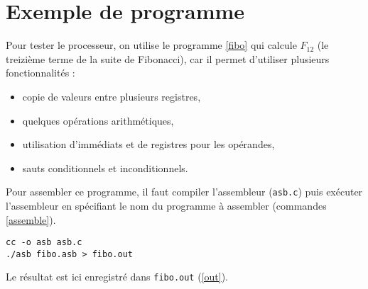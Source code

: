\section{Exemple de programme}



Pour tester le processeur, on utilise le programme \ref{fibo} qui calcule
$F_{12}$ (le treizième terme de la suite de Fibonacci\cite{fibo}), car il permet
d'utiliser plusieurs fonctionnalités :
\begin{itemize}
\item copie de valeurs entre plusieurs registres,
\item quelques opérations arithmétiques,
\item utilisation d'immédiats et de registres pour les opérandes,
\item sauts conditionnels et inconditionnels. \\
\end{itemize}

Pour assembler ce programme, il faut compiler l'assembleur (\texttt{asb.c}) puis
exécuter l'assembleur en spécifiant le nom du programme à assembler (commandes
\ref{assemble}).

\begin{lstlisting}[caption=Assemblage de \texttt{fibo.asb}, label=assemble]
cc -o asb asb.c
./asb fibo.asb > fibo.out
\end{lstlisting}

Le résultat est ici enregistré dans \texttt{fibo.out} (\ref{out}).



